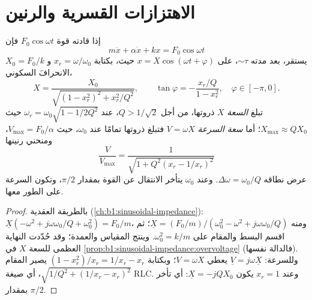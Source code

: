 \section{الاهتزازات القسرية والرنين}

\begin{theorem}\label{thm:b1:oscillators-resonance:forced}
إذا قادته قوة $F_0\cos\omega t$ فإن 
\[
m\ddot x + \alpha\dot x + kx = F_0\cos\omega t
\]
يستقر، بعد  مدته $\sim\tau$، على  $x = X\cos(\omega t + \varphi)$ حيث، بكتابة $x_r = \omega/\omega_0$
و $X_0 = F_0/k$ الانحرافَ السكوني،
\[
X = \frac{X_0}{\sqrt{(1 - x_r^2)^2 + x_r^2/Q^2}}, \qquad
\tan\varphi = -\frac{x_r/Q}{1 - x_r^2}, \quad \varphi \in [-\pi, 0] .
\]
تبلغ \emph{السعة} $X$ ذروتها، من أجل $Q > 1/\sqrt2$، عند $\omega_r =
\omega_0\sqrt{1 - 1/2Q^2}$ حيث $X_{\max} \approx QX_0$؛ أما \emph{سعة
السرعة} $V = \omega X$ فتبلغ ذروتها تمامًا عند $\omega_0$، حيث $V_{\max} =
F_0/\alpha$، ومنحني رنينها
\[
\frac{V}{V_{\max}} = \frac{1}{\sqrt{1 + Q^2(x_r - 1/x_r)^2}}
\]
عرض نطاقه $\Delta\omega = \omega_0/Q$. وعند $\omega_0$ يتأخر الانتقال
عن القوة بمقدار $\pi/2$، وتكون السرعة على الطور معها.
\end{theorem}

\begin{proof}
بالطريقة العقدية (\cref{ch:b1:sinusoidal-impedance}): $\underline X(-\omega^2
+ j\omega\omega_0/Q + \omega_0^2) = F_0/m$، ومنه $\underline X = (F_0/m)/(\omega_0^2
- \omega^2 + j\omega\omega_0/Q)$؛ ثم اقسم البسط والمقام على
$\omega_0^2 = k/m$. وينتج المقياس والعمدة؛ وقد حُدّدت النهاية العظمى للسعة $X$
في \cref{prop:b1:sinusoidal-impedance:overvoltage} (فالدالة
نفسها). وللسرعة: $\underline V = j\omega\underline X$ يعطي $V = \omega X$؛
وبكتابة $(1 - x_r^2)/x_r = 1/x_r - x_r$ يصير المقام
$\sqrt{1/Q^2 + (1/x_r - x_r)^2}$، أي صيغة RLC. وعند $x_r = 1$ يكون
$\underline X = -jQX_0$: أي تأخر بمقدار $\pi/2$.
\end{proof}

